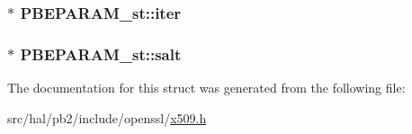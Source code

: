 \subsubsection[{\texorpdfstring{iter}{iter}}]{$\ast$ P\+B\+E\+P\+A\+R\+A\+M\+\_\+st\+::iter}\hypertarget{struct_p_b_e_p_a_r_a_m__st_a4f47729d79e3dd79bf1ccef09157cd1d}{}\label{struct_p_b_e_p_a_r_a_m__st_a4f47729d79e3dd79bf1ccef09157cd1d}
\subsubsection[{\texorpdfstring{salt}{salt}}]{$\ast$ P\+B\+E\+P\+A\+R\+A\+M\+\_\+st\+::salt}\hypertarget{struct_p_b_e_p_a_r_a_m__st_ab7fbc3e560ddba64320f0fe268d6caec}{}\label{struct_p_b_e_p_a_r_a_m__st_ab7fbc3e560ddba64320f0fe268d6caec}


The documentation for this struct was generated from the following file\+:\begin{DoxyCompactItemize}
\item 
src/hal/pb2/include/openssl/\hyperlink{x509_8h}{x509.\+h}\end{DoxyCompactItemize}
